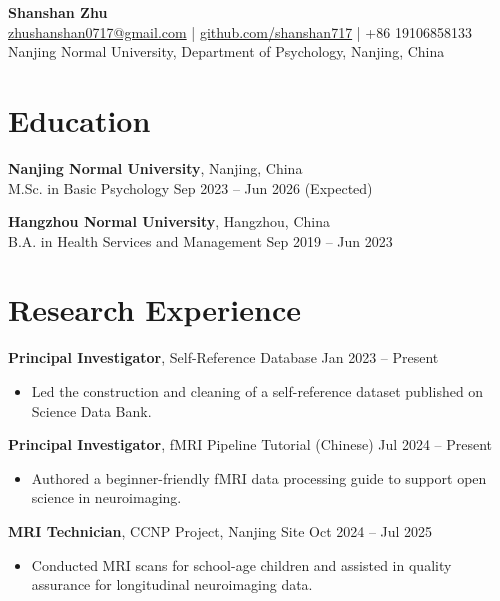 \documentclass[letterpaper,11pt,oneside]{article}
\begin{document}
\begin{center}
    {\LARGE \textbf{Shanshan Zhu}}\\
    \vspace{0.5em}
    \href{mailto:zhushanshan0717@gmail.com}{zhushanshan0717@gmail.com} \quad | \quad
    \href{https://github.com/shanshan717}{github.com/shanshan717} \quad | \quad
    +86 19106858133 \\
    Nanjing Normal University, Department of Psychology, Nanjing, China
\end{center}

\vspace{1em}

\section*{Education}
\textbf{Nanjing Normal University}, Nanjing, China \\
M.Sc. in Basic Psychology \hfill Sep 2023 -- Jun 2026 (Expected)

\textbf{Hangzhou Normal University}, Hangzhou, China \\
B.A. in Health Services and Management \hfill Sep 2019 -- Jun 2023

\section*{Research Experience}
\textbf{Principal Investigator}, Self-Reference Database \hfill Jan 2023 -- Present \\
\begin{itemize}[leftmargin=*]
    \item Led the construction and cleaning of a self-reference dataset published on Science Data Bank.
\end{itemize}

\textbf{Principal Investigator}, fMRI Pipeline Tutorial (Chinese) \hfill Jul 2024 -- Present \\
\begin{itemize}[leftmargin=*]
    \item Authored a beginner-friendly fMRI data processing guide to support open science in neuroimaging.
\end{itemize}

\textbf{MRI Technician}, CCNP Project, Nanjing Site \hfill Oct 2024 -- Jul 2025 \\
\begin{itemize}[leftmargin=*]
    \item Conducted MRI scans for school-age children and assisted in quality assurance for longitudinal neuroimaging data.
\end{itemize}
\end{document}
